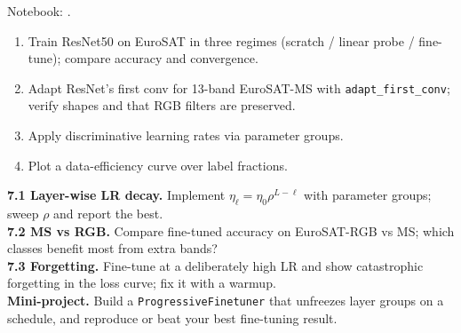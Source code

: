 \begin{practbox}
Notebook: .
\begin{enumerate}[leftmargin=1.4em,nosep]
  \item Train ResNet50 on EuroSAT in three regimes (scratch / linear probe /
  fine-tune); compare accuracy and convergence.
  \item Adapt ResNet's first conv for 13-band EuroSAT-MS with
  \texttt{adapt\_first\_conv}; verify shapes and that RGB filters are preserved.
  \item Apply discriminative learning rates via parameter groups.
  \item Plot a data-efficiency curve over label fractions.
\end{enumerate}
\end{practbox}

\begin{exbox}
\textbf{7.1 Layer-wise LR decay.} Implement $\eta_\ell=\eta_0\rho^{L-\ell}$ with
parameter groups; sweep $\rho$ and report the best.\\[2pt]
\textbf{7.2 MS vs RGB.} Compare fine-tuned accuracy on EuroSAT-RGB vs MS; which
classes benefit most from extra bands?\\[2pt]
\textbf{7.3 Forgetting.} Fine-tune at a deliberately high LR and show
catastrophic forgetting in the loss curve; fix it with a warmup.\\[2pt]
\textbf{Mini-project.} Build a \texttt{ProgressiveFinetuner} that unfreezes layer
groups on a schedule, and reproduce or beat your best fine-tuning result.
\end{exbox}

